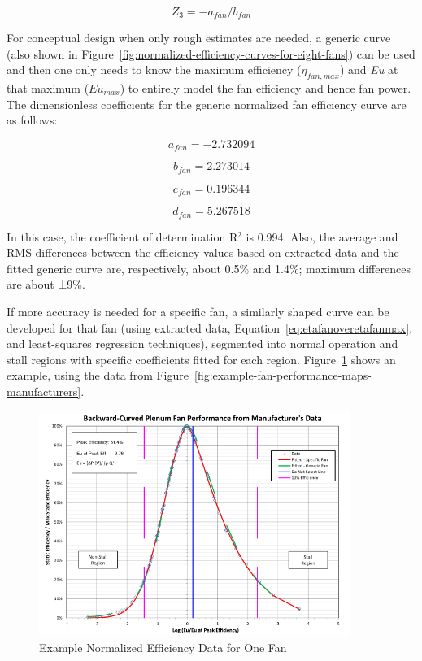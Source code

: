 \begin{equation}
Z_{3} = -a_{fan} / b_{fan}
\end{equation}

For conceptual design when only rough estimates are needed, a generic curve (also shown in Figure~\ref{fig:normalized-efficiency-curves-for-eight-fans}) can be used and then one only needs to know the maximum efficiency (\(\eta_{fan,max}\)) and \emph{Eu} at that maximum (\(Eu_{max}\)) to entirely model the fan efficiency and hence fan power. The dimensionless coefficients for the generic normalized fan efficiency curve are as follows:

\begin{equation}
{a_{fan}} = -2.732094
\end{equation}

\begin{equation}
{b_{fan}} = 2.273014
\end{equation}

\begin{equation}
{c_{fan}} = 0.196344
\end{equation}

\begin{equation}
{d_{fan}} = 5.267518
\end{equation}

In this case, the coefficient of determination R\(^{2}\) is 0.994. Also, the average and RMS differences between the efficiency values based on extracted data and the fitted generic curve are, respectively, about 0.5\% and 1.4\%; maximum differences are about ±9\%.

If more accuracy is needed for a specific fan, a similarly shaped curve can be developed for that fan (using extracted data, Equation~\ref{eq:etafanoveretafanmax}, and least-squares regression techniques), segmented into normal operation and stall regions with specific coefficients fitted for each region. Figure~\ref{fig:example-normalized-efficiency-data-for-one} shows an example, using the data from Figure~\ref{fig:example-fan-performance-maps-manufacturers}.

\begin{figure}[hbtp] %
\centering
\includegraphics[width=0.9\textwidth, height=0.9\textheight, keepaspectratio=true]{media/image4897.svg.png}
\caption{Example Normalized Efficiency Data for One Fan \protect \label{fig:example-normalized-efficiency-data-for-one}}
\end{figure}

